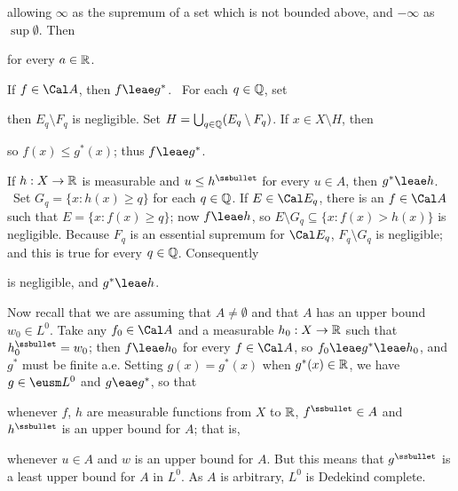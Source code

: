 {

\noindent allowing $\infty$ as the supremum of a set which is not
bounded above, and $-\infty$ as $\sup\emptyset$.   Then


\noindent for every $a\in\Bbb R$.

If $f\in\Cal A$, then $f\leae g^*$.   \Prf\ For each $q\in\Bbb Q$, set


\noindent then $E_q\setminus F_q$ is negligible.   Set
$H=\bigcup_{q\in\Bbb Q}(E_q\setminus F_q)$.   If $x\in X\setminus H$,
then


\noindent so $f(x)\le g^*(x)$;  thus $f\leae g^*$.\ \Qed

If $h:X\to\Bbb R$ is measurable and $u\le h^{\ssbullet}$ for every $u\in
A$, then $g^*\leae h$.   \Prf\ Set $G_q=\{x:h(x)\ge q\}$ for each
$q\in\Bbb Q$.   If $E\in\Cal E_q$, there is an $f\in\Cal A$ such that
$E=\{x:f(x)\ge q\}$;  now $f\leae h$, so
$E\setminus G_q\subseteq\{x:f(x)>h(x)\}$ is negligible.   Because $F_q$
is an
essential supremum for $\Cal E_q$, $F_q\setminus G_q$ is negligible;
and this is true for every $q\in\Bbb Q$.   Consequently


\noindent is negligible, and $g^*\leae h$.\ \Qed

Now recall that we are assuming that $A\ne\emptyset$ and that $A$ has an
upper bound $w_0\in L^0$.   Take any $f_0\in\Cal A$ and a measurable
$h_0:X\to\Bbb R$ such that $h_0^{\ssbullet}=w_0$;  then $f\leae h_0$
for every $f\in \Cal A$, so $f_0\leae g^*\leae h_0$, and $g^*$ must be
finite a.e.   Setting $g(x)=g^*(x)$ when $g^*(x)\in\Bbb R$, we have
$g\in\eusm L^0$ and $g\eae g^*$, so that


\noindent whenever $f$, $h$ are measurable functions from $X$ to $\Bbb
R$, $f^{\ssbullet}\in A$ and $h^{\ssbullet}$ is an upper bound for $A$;
that is,


\noindent whenever $u\in A$ and $w$ is an upper bound for $A$.   But
this means that $g^{\ssbullet}$ is a least upper bound for $A$ in $L^0$.
As $A$ is arbitrary, $L^0$ is Dedekind complete.

}
